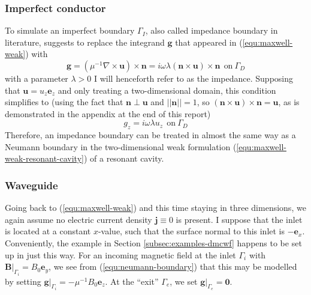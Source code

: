 \documentclass[11pt, a4paper]{article}
\begin{document}
\subsubsection{Imperfect conductor}
\label{subsubsec:impedance}

To simulate an imperfect boundary $\Gamma_I$, also called impedance boundary in literature, 
\cite{monk} suggests to replace the integrand $\mathbf{g}$ that appeared in 
(\ref{equ:maxwell-weak}) with
\begin{equation}
    \mathbf{g} = (\mu^{-1} \nabla \times \mathbf{u}) \times \mathbf{n}
    = i \omega \lambda (\mathbf{n} \times \mathbf{u}) \times \mathbf{n}~~\text{on}~\Gamma_D
\end{equation}
with a parameter $\lambda>0$ I will henceforth refer to as the impedance.
Supposing that $\mathbf{u} = u_z \mathbf{e}_z$ and only treating a
two-dimensional domain, this condition simplifies to (using the fact that $\mathbf{n} \perp \mathbf{u}$
and $||\mathbf{n}|| = 1$, so $(\mathbf{n} \times \mathbf{u}) \times \mathbf{n} = \mathbf{u}$,
as is demonstrated in the appendix at the end of this report)
\begin{equation}
    g_z = i \omega \lambda u_z~~\text{on}~\Gamma_D
\end{equation}
Therefore, an impedance boundary can be treated in almost the same way as a
Neumann boundary in the two-dimensional weak formulation (\ref{equ:maxwell-weak-resonant-cavity})
of a resonant cavity.

\subsubsection{Waveguide}
\label{subsubsec:waveguide}

Going back to (\ref{equ:maxwell-weak}) and this time staying in three dimensions,
we again assume no electric current density $\mathbf{j} \equiv 0$ is present.
I suppose that the inlet is located at a constant $x$-value,
such that the surface normal to this inlet is $-\mathbf{e}_x$. Conveniently, the example 
in Section \ref{subsec:examples-dmcwf} happens to be set up in just this way. For an incoming
magnetic field at the inlet $\Gamma_i$ with $\left.\mathbf{B}\right|_{\Gamma_i} = B_0 \mathbf{e}_y$,
we see from (\ref{equ:neumann-boundary}) that this may be modelled by setting
$\left.\mathbf{g}\right|_{\Gamma_i} = - \mu^{-1} B_0 \mathbf{e}_z$.
At the \enquote{exit} $\Gamma_e$, we set $\left.\mathbf{g}\right|_{\Gamma_e} = \boldsymbol{0}$.
\end{document}
